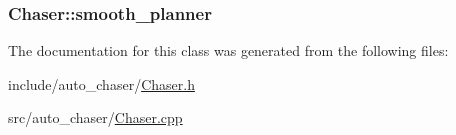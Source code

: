 \subsubsection[{\texorpdfstring{smooth\+\_\+planner}{smooth_planner}}]{ Chaser\+::smooth\+\_\+planner\hspace{0.3cm}{\ttfamily [private]}}\hypertarget{class_chaser_aab300ace64ce35c982c546cfce13f476}{}\label{class_chaser_aab300ace64ce35c982c546cfce13f476}


The documentation for this class was generated from the following files\+:\begin{DoxyCompactItemize}
\item 
include/auto\+\_\+chaser/\hyperlink{_chaser_8h}{Chaser.\+h}\item 
src/auto\+\_\+chaser/\hyperlink{_chaser_8cpp}{Chaser.\+cpp}\end{DoxyCompactItemize}
